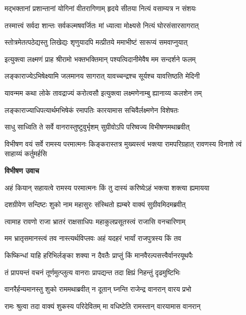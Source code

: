 \twolineshloka
{मद्भक्तानां प्रशान्तानां योगिनां वीतरागिणाम्}
{हृदये सीतया नित्यं वसाम्यत्र न संशयः} %

\twolineshloka
{तस्मात्त्वं सर्वदा शान्तः सर्वकल्मषवर्जितः}
{मां ध्यात्वा मोक्ष्यसे नित्यं घोरसंसारसागरात्} %

\twolineshloka
{स्तोत्रमेतत्पठेद्यस्तु लिखेद्यः शृणुयादपि}
{मत्प्रीतये ममाभीष्टं सारूप्यं समवाप्नुयात्} %

\twolineshloka
{इत्युक्त्वा लक्ष्मणं प्राह श्रीरामो भक्तभक्तिमान्}
{पश्यत्विदानीमेवैष मम सन्दर्शने फलम्} %

\twolineshloka
{लङ्काराज्येऽभिषेक्ष्यामि जलमानय सागरात्}
{यावच्चन्द्रश्च सूर्यश्च यावत्तिष्ठति मेदिनी} %

\twolineshloka
{यावन्मम कथा लोके तावद्राज्यं करोत्वसौ}
{इत्युक्त्वा लक्ष्मणेनाम्बु ह्यानाय्य कलशेन तम्} %

\twolineshloka
{लङ्काराज्याधिपत्यार्थमभिषेकं रमापतिः}
{कारयामास सचिवैर्लक्ष्मणेन विशेषतः} %

\twolineshloka
{साधु साध्विति ते सर्वे वानरास्तुष्टुवुर्भृशम्}
{सुग्रीवोऽपि परिष्वज्य विभीषणमथाब्रवीत्} %

\threelineshloka
{विभीषण वयं सर्वे रामस्य परमात्मनः}
{किङ्करास्तत्र मुख्यस्त्वं भक्त्या रामपरिग्रहात्}
{रावणस्य विनाशे त्वं साहाय्यं कर्तुमर्हसि} %

\textbf{विभीषण उवाच}

\twolineshloka
{अहं कियान् सहायत्वे रामस्य परमात्मनः}
{किं तु दास्यं करिष्येऽहं भक्त्या शक्त्या ह्यमायया} %

\twolineshloka
{दशग्रीवेण सन्दिष्टः शुको नाम महासुरः}
{संस्थितो ह्यम्बरे वाक्यं सुग्रीवमिदमब्रवीत्} %

\twolineshloka
{त्वामाह रावणो राजा भ्रातरं राक्षसाधिपः}
{महाकुलप्रसूतस्त्वं राजासि वनचारिणाम्} %

\twolineshloka
{मम भ्रातृसमानस्त्वं तव नास्त्यर्थविप्लवः}
{अहं यदहरं भार्यां राजपुत्रस्य किं तव} %

\twolineshloka
{किष्किन्धां याहि हरिभिर्लङ्का शक्या न दैवतैः}
{प्राप्तुं किं मानवैरल्पसत्त्वैर्वानरयूथपैः} %

\twolineshloka
{तं प्रापयन्तं वचनं तूर्णमुत्प्लुत्य वानराः}
{प्रापद्यन्त तदा क्षिप्रं निहन्तुं दृढमुष्टिभिः} %

\twolineshloka
{वानरैर्हन्यमानस्तु शुको राममथाब्रवीत्}
{न दूतान् घ्नन्ति राजेन्द्र वानरान् वारय प्रभो} %

\twolineshloka
{रामः श्रुत्वा तदा वाक्यं शुकस्य परिदेवितम्}
{मा वधिष्टेति रामस्तान् वारयामास वानरान्} %

